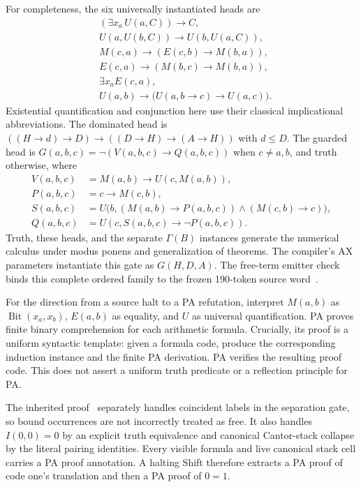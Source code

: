 \documentclass[11pt,letterpaper]{article}
\begin{document}
For completeness, the six universally instantiated heads are
\begin{align*}
 &(\exists x_a\,U(a,C))\to C,\\
 &U(a,U(b,C))\to U(b,U(a,C)),\\
 &M(c,a)\to(E(c,b)\to M(b,a)),\\
 &E(c,a)\to(M(b,c)\to M(b,a)),\\
 &\exists x_a E(c,a),\\
 &U(a,b)\to\bigl(U(a,b\to c)\to U(a,c)\bigr).
\end{align*}
Existential quantification and conjunction here use their classical
implicational abbreviations. The dominated head is
$((H\to d)\to D)\to((D\to H)\to(A\to H))$ with $d\le D$.
The guarded head is $G(a,b,c)=\neg(V(a,b,c)\to Q(a,b,c))$ when
$c\ne a,b$, and truth otherwise, where
\begin{align*}
 V(a,b,c)&=M(a,b)\to U(c,M(a,b)),\\
 P(a,b,c)&=c\to M(c,b),\\
 S(a,b,c)&=U\bigl(b,(M(a,b)\to P(a,b,c))
                      \wedge(M(c,b)\to c)\bigr),\\
 Q(a,b,c)&=U(c,S(a,b,c)\to\neg P(a,b,c)).
\end{align*}
Truth, these heads, and the separate $\Gamma(B)$ instances generate the
numerical calculus under modus ponens and generalization of theorems.
The compiler's AX parameters instantiate this gate as $G(H,D,A)$.
The free-term emitter check binds this complete ordered family to the
frozen 190-token source word~\cite{primary,n}.

For the direction from a source halt to a PA refutation, interpret
$M(a,b)$ as $\operatorname{Bit}(x_a,x_b)$, $E(a,b)$ as equality, and $U$
as universal quantification. PA proves finite binary comprehension for
each arithmetic formula. Crucially, its proof is a uniform syntactic
template: given a formula code, produce the corresponding induction
instance and the finite PA derivation. PA verifies the resulting proof
code. This does not assert a uniform truth predicate or a reflection
principle for PA.

The inherited proof~\cite{calibration,primary} separately handles coincident labels in the
separation gate, so bound occurrences are not incorrectly treated as
free. It also handles $I(0,0)=0$ by an explicit truth equivalence and
canonical Cantor-stack collapse by the literal pairing identities.
Every visible formula and live canonical stack cell carries a PA proof
annotation. A halting Shift therefore extracts a PA proof of code one's
translation and then a PA proof of $0=1$.
\end{document}
